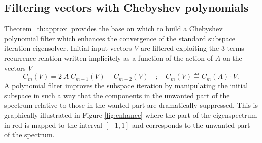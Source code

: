 \subsection{Filtering vectors with Chebyshev polynomials}
\label{sec-2-3}

Theorem~\ref{th:approx} provides the base on which to build a
Chebyshev polynomial filter which enhances the convergence of the standard subspace iteration eigensolver. Initial input vectors $V$ are
filtered exploiting the $3$-terms recurrence relation written
implicitely as a function of the action of $A$ on the vectors $V$
\begin{equation}
\label{eq:3term}
C_{m}(V) = 2\ A\ C_{m-1}(V) - C_{m-2}(V) \quad ; 
\quad C_m(V) \eqdef C_m(A)\cdot V. 
\end{equation}
A polynomial filter improves the subspace iteration by manipulating
the initial subspace in such a way that the components in the unwanted
part of the spectrum relative to those in the wanted part are
dramatically suppressed. This is graphically illustrated in Figure \ref{fig:enhance} where the part of the eigenspectrum in red is mapped to the interval $[-1, 1]$ and corresponds to the unwanted part of the spectrum.  

